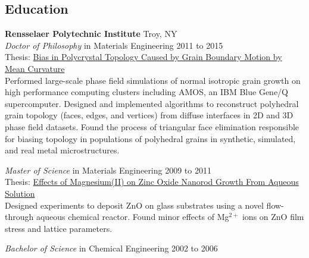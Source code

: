 \documentclass[margin]{res}
\begin{document}
\begin{resume}
\section{Education}
\textbf{Rensselaer Polytechnic Institute}\hfill{} Troy, NY\\[0.25\baselineskip]
\textit{Doctor of Philosophy} in Materials Engineering\hfill{} 2011 to 2015\\
Thesis: \href{https://hdl.handle.net/20.500.13015/4}{Bias in Polycrystal Topology Caused by Grain Boundary Motion by Mean Curvature}\\[0.25\baselineskip]
Performed large-scale phase field simulations of normal isotropic grain growth on high performance computing clusters including AMOS, an IBM Blue Gene/Q supercomputer. Designed and implemented algorithms to reconstruct polyhedral grain topology (faces, edges, and vertices) from diffuse interfaces in 2D and 3D phase field datasets. Found the process of triangular face elimination responsible for biasing topology in populations of polyhedral grains in synthetic, simulated, and real metal microstructures.


\textit{Master of Science} in Materials Engineering\hfill{} 2009 to 2011\\
Thesis: \href{https://hdl.handle.net/20.500.13015/4}{Effects of Magnesium(II) on Zinc Oxide Nanorod Growth From Aqueous Solution}\\[0.25\baselineskip]
Designed experiments to deposit ZnO on glass substrates using a novel flow-through aqueous chemical reactor. Found minor effects of Mg$^{2+}$ ions on ZnO film stress and lattice parameters.


\textit{Bachelor of Science} in Chemical Engineering\hfill{} 2002 to 2006\\



\end{resume}
\end{document}
